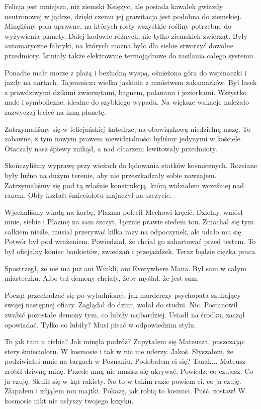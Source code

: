 Felicja jest mniejsza, niż ziemski Księżyc, ale posiada kawałek gwiazdy neutronowej w jądrze, dzięki czemu jej grawitacja jest podobna do ziemskiej.
Minęliśmy pola uprawne, na których rosły wszystkie rośliny potrzebne do wyżywienia planety.
Dalej hodowle różnych, nie tylko ziemskich zwierząt.
Były automatyczne fabryki, na których można było dla siebie stworzyć dowolne przedmioty.
Istniały także elektrownie termojądrowe do zasilania całego systemu.

Ponadto małe morze z plażą i bezludną wyspą, ośnieżona góra do wspinaczki i jazdy na nartach.
Tajemnicza wielka jaskinia z mnóstwem zakamarków.
Był lasek z prawdziwymi dzikimi zwierzętami, bagnem, polanami i jeziorkami.
Wszystko małe i symboliczne, idealne do szybkiego wypadu.
Na większe wakacje należało zazwyczaj lecieć na inną planetę.

Zatrzymaliśmy się w felicjańskiej katedrze, na obowiązkową niedzielną mszę.
To zabawne, z tym nowym prawem niewidzialności byliśmy jedynymi w kościele. 
Otaczały nasz śpiewy znikąd, a nad ołtarzem lewitowały przedmioty.

Skończyliśmy wyprawę przy wieżach do lądowania statków kosmicznych.
Rozsiane były luźno na dużym terenie, aby nie przeszkadzały sobie nawzajem.
Zatrzymaliśmy się pod tą właśnie konstrukcją, którą widziałem wcześniej nad ranem.
Obły kształt śmieciolotu majaczył na szczycie.

Wjechaliśmy windą na korbę, Plazma polecił Mechowi kręcić.
Dzielny, wniósł mnie, siebie i Plazmę na sam szczyt, łącznie prawie siedem ton. 
Zmachał się tym całkiem nieźle, musiał przerywać kilka razy na odpoczynek, ale udało mu się.
Potwór był pod wrażeniem. Powiedział, że chciał go zahartować przed testem. 
To był oficjalny koniec bankietów, zwiedzań i przejażdżek. Teraz będzie ciężka praca.

\divider{}

Spostrzegł, że nie ma już ani Winkli, ani Everywhere Mana. 
Był sam w całym miasteczku.
Albo też demony chciały, żeby myślał, że jest sam.

Począł przechadzać się po wyludnionej, jak morderczy psychopata szukający swojej następnej ofiary. Zaglądał do dziur, wołał do studni. Nic.
Postanowił zwabić pozostałe demony tym, co lubiły najbardziej.
Usiadł na środku, zaczął opowiadać. Tylko co lubiły?
Musi pisać w odpowiednim stylu.

\divider{} %

\begin{dialogue}
\ds{} To jak tam u ciebie? Jak minęła podróż? \dm{} Zapytałem się Mateusza, puszczając stery śmieciolotu. W kosmosie i tak w nic nie uderzy.
\ds{} Jakoś.
\ds{} Słyszałem, że podziwiałeś mnie na targach w Poznaniu. Podobałem ci się?
\ds{} Taaak... \dm{} Mateusz zrobił dziwną minę.
\ds{} Przede mną nie musisz się ukrywać. Powiedz, co czujesz.
\ds{} Co ja czuję. \dm{} Skulił się w kąt rakiety.
\ds{} No to w takim razie powiem ci, co ja czuję. \dm{} Złapałem i zdjąłem mu majtki. \dm{} Pokażę, jak robią to kosmici.
\ds{} Puść, zostaw!
\ds{} W kosmosie nikt nie usłyszy twojego krzyku.
\end{dialogue}

